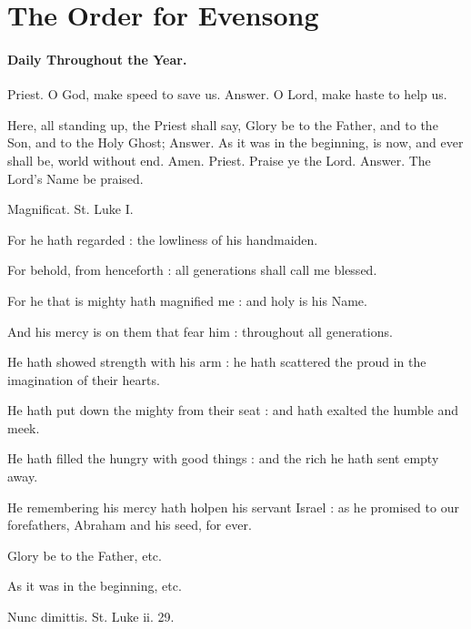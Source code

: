 \chapter{The Order for Evensong}
\subsubsection{Daily Throughout the Year.}

Priest. O God, \cross make speed to save us.
Answer. O Lord, make haste to help us.

Here, all standing up, the Priest shall say,
 Glory be to the Father, and to the Son, and to the Holy Ghost;
Answer. As it was in the beginning, is now, and ever shall be, world without end. Amen.
Priest. Praise ye the Lord.
Answer. The Lord's Name be praised.


Magnificat.
St. Luke I.

For he hath regarded : the lowliness of his handmaiden.

For behold, from henceforth : all generations shall call me blessed.

For he that is mighty hath magnified me : and holy is his Name.

And his mercy is on them that fear him : throughout all generations.

He hath showed strength with his arm : he hath scattered the proud in the imagination of their hearts.

He hath put down the mighty from their seat : and hath exalted the humble and meek.

He hath filled the hungry with good things : and the rich he hath sent empty away.

He remembering his mercy hath holpen his servant Israel : as he promised to our forefathers, Abraham and his seed, for ever.

Glory be to the Father, etc.

As it was in the beginning, etc.


Nunc dimittis.
St. Luke ii. 29.

